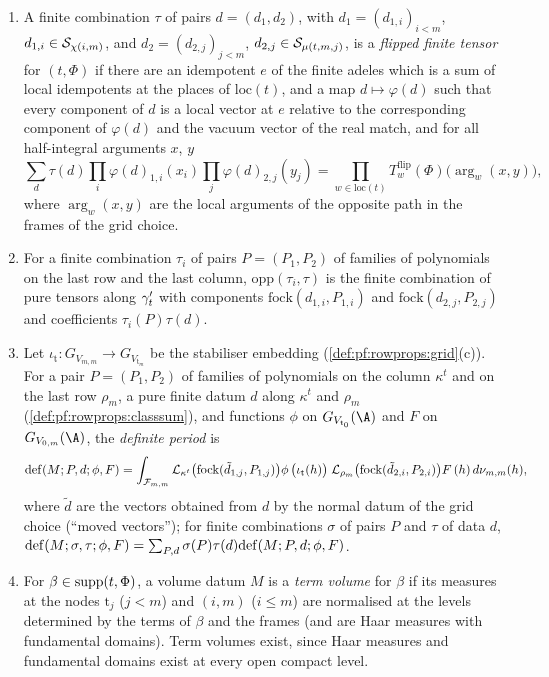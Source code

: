 \begin{definition}\label{def:pf:rowprops:flipfin}
\begin{enumerate}[label=(\alph*)]
\item A finite combination $\tau$ of pairs $d=(d_1,d_2)$, with $d_1=(d_{1,i})_{i<m}$, $d_{1,i}\in\mathcal{S}_{\chi(i,m)}$, and
$d_2=(d_{2,j})_{j<m}$, $d_{2,j}\in\mathcal{S}_{\mu(t,m,j)}$, is a \emph{flipped finite tensor} for $(t,\Phi)$ if there are an
idempotent $e$ of the finite adeles which is a sum of local idempotents at the places of $\mathrm{loc}(t)$, and a map
$d\mapsto\varphi(d)$ such that every component of $d$ is a local vector at $e$ relative to the corresponding component
of $\varphi(d)$ and the vacuum vector of the real match, and for all half-integral arguments $x$, $y$
\[
\sum_d\tau(d)\prod_i\varphi(d)_{1,i}(x_i)\prod_j\varphi(d)_{2,j}(y_j)=\prod_{w\in\mathrm{loc}(t)}T^{\mathrm{flip}}_w(\Phi)\bigl(\arg_w(x,y)\bigr),
\]
where $\arg_w(x,y)$ are the local arguments of the opposite path in the frames of the grid choice.
\item For a finite combination $\tau_i$ of pairs $P=(P_1,P_2)$ of families of polynomials on the last row and the last
column, $\mathrm{opp}(\tau_i,\tau)$ is the finite combination of pure tensors along $\gamma'_t$ with components
$\mathrm{fock}(d_{1,i},P_{1,i})$ and $\mathrm{fock}(d_{2,j},P_{2,j})$ and coefficients $\tau_i(P)\tau(d)$.
\item Let $\iota_{\mathrm t}:G_{V_{m,m}}\to G_{V_{\mathrm t_m}}$ be the stabiliser embedding (\cref{def:pf:rowprops:grid}(c)).
For a pair $P=(P_1,P_2)$ of families of polynomials on the column $\kappa^t$ and on the last row $\rho_m$, a pure finite
datum $d$ along $\kappa^t$ and $\rho_m$ (\cref{def:pf:rowprops:classsum}), and functions $\phi$ on $G_{V_{\mathrm
t_0}}(\A)$ and $F$ on $G_{V_{0,m}}(\A)$, the \emph{definite period} is
\begin{equation}\label{eq:pf:rowprops:defper}
\mathrm{def}(M;P,d;\phi,F)=\int_{\mathcal{F}_{m,m}}\mathcal{L}_{\kappa^t}\bigl(\mathrm{fock}(\tilde d_{1,j},P_{1,j})\bigr)\phi\,\bigl(\iota_{\mathrm t}(h)\bigr)\;
\mathcal{L}_{\rho_m}\bigl(\mathrm{fock}(\tilde d_{2,i},P_{2,i})\bigr)F\,(h)\,d\nu_{m,m}(h),
\end{equation}
where $\tilde d$ are the vectors obtained from $d$ by the normal datum of the grid choice (``moved vectors''); for finite
combinations $\sigma$ of pairs $P$ and $\tau$ of data $d$, $\mathrm{def}(M;\sigma,\tau;\phi,F)=\sum_{P,d}\sigma(P)\tau(d)
\mathrm{def}(M;P,d;\phi,F)$.
\item For $\beta\in\mathrm{supp}(t,\Phi)$, a volume datum $M$ is a \emph{term volume} for $\beta$ if its measures at the
nodes $\mathrm t_j$ ($j<m$) and $(i,m)$ ($i\le m$) are normalised at the levels determined by the terms of $\beta$ and the
frames (and are Haar measures with fundamental domains). Term volumes exist, since Haar measures and fundamental domains
exist at every open compact level.
\end{enumerate}
\end{definition}

